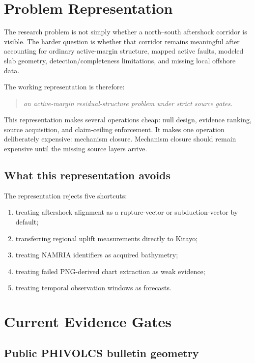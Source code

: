 \documentclass[11pt]{article}
\begin{document}
\section{Problem Representation}

The research problem is not simply whether a north--south aftershock corridor is visible. The harder question is whether that corridor remains meaningful after accounting for ordinary active-margin structure, mapped active faults, modeled slab geometry, detection/completeness limitations, and missing local offshore data.

The working representation is therefore:
\begin{quote}
\emph{an active-margin residual-structure problem under strict source gates.}
\end{quote}

This representation makes several operations cheap: null design, evidence ranking, source acquisition, and claim-ceiling enforcement. It makes one operation deliberately expensive: mechanism closure. Mechanism closure should remain expensive until the missing source layers arrive.

\subsection{What this representation avoids}

The representation rejects five shortcuts:
\begin{enumerate}[leftmargin=2em]
  \item treating aftershock alignment as a rupture-vector or subduction-vector by default;
  \item transferring regional uplift measurements directly to Kitayo;
  \item treating NAMRIA identifiers as acquired bathymetry;
  \item treating failed PNG-derived chart extraction as weak evidence;
  \item treating temporal observation windows as forecasts.
\end{enumerate}

\section{Current Evidence Gates}

\subsection{Public PHIVOLCS bulletin geometry}
\end{document}
